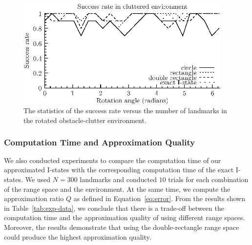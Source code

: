 \begin{figure}
  \begin{center}
    \includegraphics[width=0.95\textwidth]{figs/exp_rot_clutter}
  \end{center}
  \caption{The statistics of the success rate versus 
    the number of landmarks in the rotated obstacle-clutter environment.}
  \label{fig:sucRate5}
\end{figure}

\subsubsection{Computation Time and Approximation Quality}

We also conducted experiments to compare the computation time of our approximated
I-states with the corresponding computation time of the exact I-states.  
%
We used $N=300$ landmarks and conducted $10$ trials for each combination of the range space
and the environment.  
%
At the same time, we compute the approximation ratio $Q$ as defined in Equation~\ref{eq:error}.  
%
From the results shown in Table~\ref{tab:exp-data}, 
we conclude that there is a trade-off between the computation time and the approximation quality of using different range spaces. 
%
Moreover, the results demonstrate that using the double-rectangle range space could produce the highest approximation quality.

